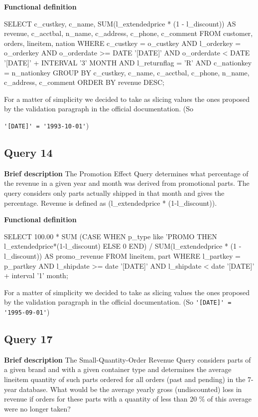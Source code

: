 \textbf{Functional definition}
\begin{sql}
SELECT
    c_custkey,
    c_name,
    SUM(l_extendedprice * (1 - l_discount)) AS revenue,
    c_acctbal,
    n_name,
    c_address,
    c_phone,
    c_comment
FROM
    customer,
    orders,
    lineitem,
    nation
WHERE
    c_custkey = o_custkey
    AND l_orderkey = o_orderkey
    AND o_orderdate >= DATE '[DATE]'
    AND o_orderdate < DATE '[DATE]' + INTERVAL '3' MONTH
    AND l_returnflag = 'R'
    AND c_nationkey = n_nationkey
GROUP BY
    c_custkey,
    c_name,
    c_acctbal,
    c_phone,
    n_name,
    c_address,
    c_comment
ORDER BY
    revenue DESC;
\end{sql}

For a matter of simplicity we decided to take as slicing values the ones proposed by the validation paragraph in the official documentation. (So

\verb|'[DATE]' = '1993-10-01'|)

\subsection{Query 14}
\textbf{Brief description}
The Promotion Effect Query determines what percentage of the revenue in a given year and month was derived from 
promotional parts. The query considers only parts actually shipped in that month and gives the percentage. Revenue 
is defined as (l\_extendedprice * (1-l\_discount)).


\textbf{Functional definition}
\begin{sql}
SELECT 
    100.00 * SUM (CASE WHEN p_type like 'PROMO%
                  THEN l_extendedprice*(1-l_discount) 
                  ELSE 0 END) / SUM(l_extendedprice * (1 - l_discount)) 
    AS promo_revenue
FROM 
    lineitem, 
    part
WHERE 
    l_partkey = p_partkey
    AND l_shipdate >= date '[DATE]'
    AND l_shipdate < date '[DATE]' + interval '1' month;

\end{sql}

For a matter of simplicity we decided to take as slicing values the ones proposed by the validation paragraph in the official documentation. (So \verb|'[DATE]' = '1995-09-01'|)


\subsection{Query 17}

\textbf{Brief description}
The Small-Quantity-Order Revenue Query considers parts of a given brand and with a given container type and 
determines the average lineitem quantity of such parts ordered for all orders (past and pending) in the 7-year database. What would be the average yearly gross (undiscounted) loss in revenue if orders for these parts with a quantity 
of less than 20 \% of this average were no longer taken?

